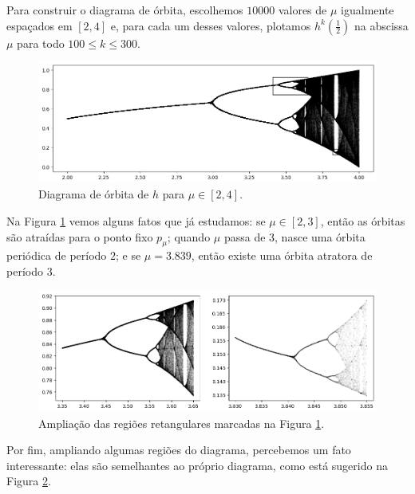 Para construir o diagrama de órbita, escolhemos $10000$ valores de $\mu$ igualmente espaçados em $[2, 4]$ e, para cada um desses valores, plotamos $h^k(\frac{1}{2})$ na abscissa $\mu$ para todo $100 \leq k \leq 300$.

\begin{figure}[!htb]
\centering
\includegraphics[scale=0.6]{images/period-doubling-and-zoom1.png}
\caption{Diagrama de órbita de $h$ para $\mu \in [2, 4]$.}
\label{period-doubling}
\end{figure}

Na Figura \ref{period-doubling} vemos alguns fatos que já estudamos: se $\mu \in [2, 3]$, então as órbitas são atraídas para o ponto fixo $p_\mu$; quando $\mu$ passa de $3$, nasce uma órbita periódica de período $2$; e se $\mu = 3.839$, então existe uma órbita atratora de período $3$.

\begin{figure}[H]
\centering
\includegraphics[scale=0.6]{images/period-doubling-and-zoom2.png}
\caption{Ampliação das regiões retangulares marcadas na Figura \ref{period-doubling}.}
\label{period-doubling1}
\end{figure}

Por fim, ampliando algumas regiões do diagrama, percebemos um fato interessante: elas são semelhantes ao próprio diagrama, como está sugerido na Figura \ref{period-doubling1}.
